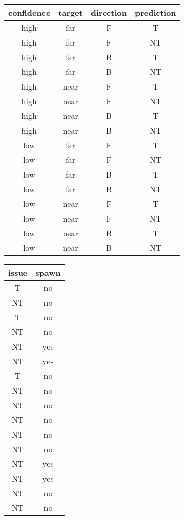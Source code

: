 \begin{tabular}{|c|c|c|c|}
\hline 
confidence&
target&
direction&
prediction\\
\hline
\hline 
high&
far&
F&
T\\
\hline 
high&
far&
F&
NT\\
\hline 
high&
far&
B&
T\\
\hline 
high&
far&
B&
NT\\
\hline 
high&
near&
F&
T\\
\hline 
high&
near&
F&
NT\\
\hline 
high&
near&
B&
T\\
\hline 
high&
near&
B&
NT\\
\hline 
low&
far&
F&
T\\
\hline 
low&
far&
F&
NT\\
\hline 
low&
far&
B&
T\\
\hline 
low&
far&
B&
NT\\
\hline 
low&
near&
F&
T\\
\hline 
low&
near&
F&
NT\\
\hline 
low&
near&
B&
T\\
\hline 
low&
near&
B&
NT\\
\hline
\end{tabular}\begin{tabular}{|c|c|}
\hline 
issue&
spawn\\
\hline
\hline 
T&
no\\
\hline 
NT&
no\\
\hline 
T&
no\\
\hline 
NT&
no\\
\hline 
NT&
yes\\
\hline 
NT&
yes\\
\hline 
T&
no\\
\hline 
NT&
no\\
\hline 
NT&
no\\
\hline 
NT&
no\\
\hline 
NT&
no\\
\hline 
NT&
no\\
\hline 
NT&
yes\\
\hline 
NT&
yes\\
\hline 
NT&
no\\
\hline 
NT&
no\\
\hline
\end{tabular}
